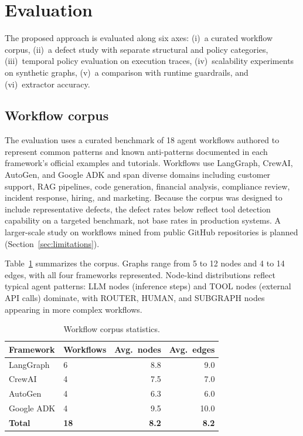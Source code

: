 \section{Evaluation}
\label{sec:evaluation}

The proposed approach is evaluated along six axes: (i)~a curated workflow
corpus, (ii)~a defect study with separate structural and policy
categories, (iii)~temporal policy evaluation on execution traces,
(iv)~scalability experiments on synthetic graphs, (v)~a comparison
with runtime guardrails, and (vi)~extractor accuracy.

\subsection{Workflow corpus}

The evaluation uses a curated benchmark of 18 agent workflows
authored to represent common patterns and known anti-patterns documented
in each framework's official examples and tutorials. Workflows use
LangGraph, CrewAI, AutoGen, and Google ADK and span diverse domains
including customer support, RAG pipelines, code generation, financial
analysis, compliance review, incident response, hiring, and marketing.
Because the corpus was designed to include representative defects, the
defect rates below reflect tool detection capability on a targeted
benchmark, not base rates in production systems. A larger-scale study on
workflows mined from public GitHub repositories is planned
(Section~\ref{sec:limitations}).

Table~\ref{tab:corpus} summarizes the corpus. Graphs range from 5 to
12 nodes and 4 to 14 edges, with all four frameworks represented.
Node-kind distributions reflect typical agent patterns: LLM nodes
(inference steps) and TOOL nodes (external API calls) dominate, with
ROUTER, HUMAN, and SUBGRAPH nodes appearing in more complex workflows.

\begin{table}[t]
\centering
\small
\caption{Workflow corpus statistics.}
\label{tab:corpus}
\begin{tabular}{@{}llrr@{}}
\toprule
\textbf{Framework} & \textbf{Workflows} & \textbf{Avg.\ nodes} & \textbf{Avg.\ edges} \\
\midrule
LangGraph & 6 & 8.8 & 9.0 \\
CrewAI & 4 & 7.5 & 7.0 \\
AutoGen & 4 & 6.3 & 6.0 \\
Google ADK & 4 & 9.5 & 10.0 \\
\midrule
\textbf{Total} & \textbf{18} & \textbf{8.2} & \textbf{8.2} \\
\bottomrule
\end{tabular}
\end{table}

